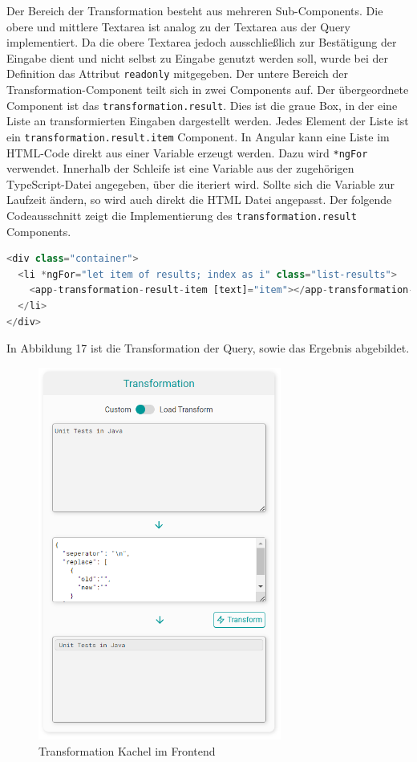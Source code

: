 Der Bereich der Transformation besteht aus mehreren Sub-Components. Die obere und mittlere Textarea ist analog zu der Textarea aus der Query implementiert. Da die obere Textarea jedoch ausschließlich zur Bestätigung der Eingabe dient und nicht selbst zu Eingabe genutzt werden soll, wurde bei der Definition das Attribut \texttt{readonly} mitgegeben. Der untere Bereich der Transformation-Component teilt sich in zwei Components auf. Der übergeordnete Component ist das \texttt{transformation.result}. Dies ist die graue Box, in der eine Liste an transformierten Eingaben dargestellt werden. Jedes Element der Liste ist ein \texttt{transformation.result.item} Component. In Angular kann eine Liste im HTML-Code direkt aus einer Variable erzeugt werden. Dazu wird \texttt{*ngFor} verwendet. Innerhalb der Schleife ist eine Variable aus der zugehörigen TypeScript-Datei angegeben, über die iteriert wird. Sollte sich die Variable zur Laufzeit ändern, so wird auch direkt die HTML Datei angepasst. Der folgende Codeausschnitt zeigt die Implementierung des \texttt{transformation.result} Components.

\begin{lstlisting}[language=Python, caption={Anzeige der Results aus der Transformation}]
<div class="container">
  <li *ngFor="let item of results; index as i" class="list-results">
    <app-transformation-result-item [text]="item"></app-transformation-result-item>
  </li>
</div>
\end{lstlisting}

In Abbildung 17 ist die Transformation der Query, sowie das Ergebnis abgebildet.

\begin{figure}[H]
  \centering
    \includegraphics[width = 8cm]{bilder/websiteTransformation}
    \caption{Transformation Kachel im Frontend}
\end{figure}

